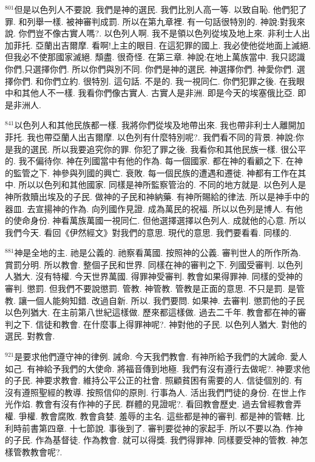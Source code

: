 \documentclass{book}
\begin{document}
$^{801}$但是以色列人不要說.
我們是神的選民.
我們比別人高一等.
以致自恥.
他們犯了罪.
和列舉一樣.
被神審判成罰.
所以在第九章裡.
有一句話很特別的.
神說:對我來說.
你們豈不像古實人嗎?.
以色列人啊.
我不是領以色列從埃及地上來.
非利士人出加菲托.
亞蘭出吉爾摩.
看啊!上主的眼目.
在這犯罪的國上.
我必使他從地面上滅絕.
但我必不使那國家滅絕.
頹盡.
很奇怪.
在第三章.
神說:在地上萬族當中.
我只認識你們,只選擇你們.
所以你們與別不同.
你們是神的選民.
神選擇你們.
神愛你們.
選擇你們.
和你們立約.
很特別.
這句話.
不是的.
我一視同仁.
你們犯罪之後.
在我眼中和其他人不一樣.
我看你們像古實人.
古實人是非洲.
即是今天的埃塞俄比亞.
即是非洲人.

$^{841}$以色列人和其他民族都一樣.
我將你們從埃及地帶出來.
我也帶非利士人離開加菲托.
我也帶亞蘭人出吉爾摩.
以色列有什麼特別呢?.
我們看不同的背景.
神說:你是我的選民.
所以我要追究你的罪.
你犯了罪之後.
我看你和其他民族一樣.
很公平的.
我不偏待你.
神在列國當中有他的作為.
每一個國家.
都在神的看顧之下.
在神的監管之下.
神參與列國的興亡.
衰敗.
每一個民族的遭遇和遷徙.
神都有工作在其中.
所以以色列和其他國家.
同樣是神所監察管治的.
不同的地方就是.
以色列人是神所救贖出埃及的子民.
做神的子民和神納藥.
有神所賜給的律法.
所以是神手中的器皿.
去宣揚神的作為.
向列國作見證.
成為萬民的祝福.
所以以色列是博人.
有他的使命身份.
神看萬族萬國一視同仁.
但他選擇選擇以色列人.
成就他的心意.
所以我們今天.
看回《伊然經文》對我們的意思.
現代的意思.
我們要看看.
同樣的.

$^{881}$神是全地的主.
祂是公義的.
祂察看萬國.
按照神的公義.
審判世人的所作所為.
賞罰分明.
所以教會.
整個子民和世界.
同樣在神的審判之下.
列國受審判.
以色列人猶大.
沒有特權.
今天世界萬國.
得罪神受審判.
教會如果得罪神.
同樣的受神的審判.
懲罰.
但我們不要說懲罰.
管教.
神管教.
管教是正面的意思.
不只是罰.
是管教.
讓一個人能夠知錯.
改過自新.
所以.
我們要問.
如果神.
去審判.
懲罰他的子民以色列猶大.
在主前第八世紀這樣做.
歷來都這樣做.
過去二千年.
教會都在神的審判之下.
信徒和教會.
在什麼事上得罪神呢?.
神對他的子民.
以色列人猶大.
對他的選民.
對教會.

$^{921}$是要求他們遵守神的律例.
誡命.
今天我們教會.
有神所給予我們的大誡命.
愛人如己.
有神給予我們的大使命.
將福音傳到地極.
我們有沒有遵行去做呢?.
神要求他的子民.
神要求教會.
維持公平公正的社會.
照顧貧困有需要的人.
信徒個別的.
有沒有遵照聖經的教導.
按照信仰的原則.
行事為人.
活出我們門徒的身份.
在世上作光作焰.
教會有沒有作神的子民.
群體的見證呢?.
看回教會歷史.
過去曾經教會弄權.
爭權.
教會腐敗.
教會貪婪.
羞辱的主名.
這些都是神的審判.
都是神的管轄.
比利時前書第四章.
十七節說.
事後到了.
審判要從神的家起手.
所以不要以為.
作神的子民.
作為基督徒.
作為教會.
就可以得獎.
我們得罪神.
同樣要受神的管教.
神怎樣管教教會呢?.
\end{document}
